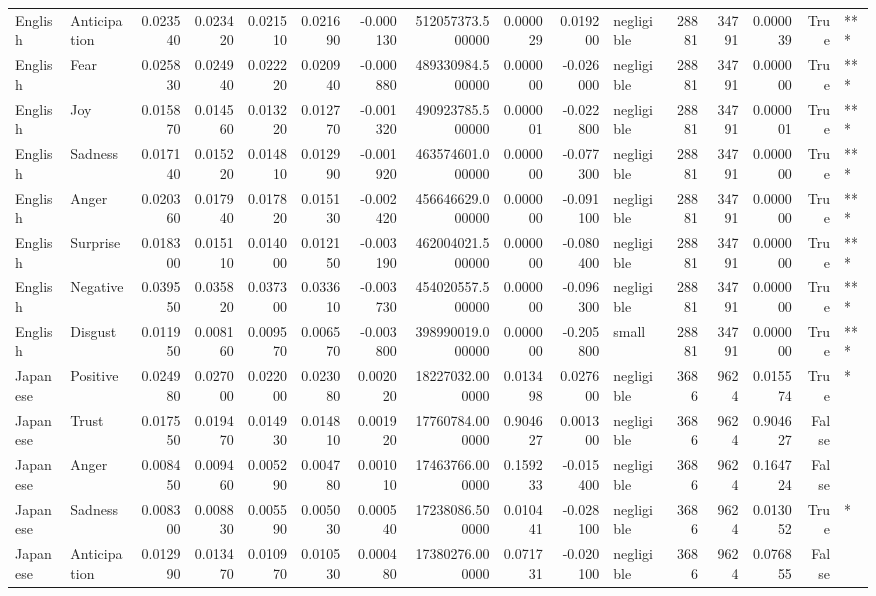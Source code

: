 \begin{tabular}{llrrrrrrrrlrrrrl}
English & Anticipation & 0.023540 & 0.023420 & 0.021510 & 0.021690 & -0.000130 & 512057373.500000 & 0.000029 & 0.019200 & negligible & 28881 & 34791 & 0.000039 & True & *** \\
English & Fear & 0.025830 & 0.024940 & 0.022220 & 0.020940 & -0.000880 & 489330984.500000 & 0.000000 & -0.026000 & negligible & 28881 & 34791 & 0.000000 & True & *** \\
English & Joy & 0.015870 & 0.014560 & 0.013220 & 0.012770 & -0.001320 & 490923785.500000 & 0.000001 & -0.022800 & negligible & 28881 & 34791 & 0.000001 & True & *** \\
English & Sadness & 0.017140 & 0.015220 & 0.014810 & 0.012990 & -0.001920 & 463574601.000000 & 0.000000 & -0.077300 & negligible & 28881 & 34791 & 0.000000 & True & *** \\
English & Anger & 0.020360 & 0.017940 & 0.017820 & 0.015130 & -0.002420 & 456646629.000000 & 0.000000 & -0.091100 & negligible & 28881 & 34791 & 0.000000 & True & *** \\
English & Surprise & 0.018300 & 0.015110 & 0.014000 & 0.012150 & -0.003190 & 462004021.500000 & 0.000000 & -0.080400 & negligible & 28881 & 34791 & 0.000000 & True & *** \\
English & Negative & 0.039550 & 0.035820 & 0.037300 & 0.033610 & -0.003730 & 454020557.500000 & 0.000000 & -0.096300 & negligible & 28881 & 34791 & 0.000000 & True & *** \\
English & Disgust & 0.011950 & 0.008160 & 0.009570 & 0.006570 & -0.003800 & 398990019.000000 & 0.000000 & -0.205800 & small & 28881 & 34791 & 0.000000 & True & *** \\
Japanese & Positive & 0.024980 & 0.027000 & 0.022000 & 0.023080 & 0.002020 & 18227032.000000 & 0.013498 & 0.027600 & negligible & 3686 & 9624 & 0.015574 & True & * \\
Japanese & Trust & 0.017550 & 0.019470 & 0.014930 & 0.014810 & 0.001920 & 17760784.000000 & 0.904627 & 0.001300 & negligible & 3686 & 9624 & 0.904627 & False &  \\
Japanese & Anger & 0.008450 & 0.009460 & 0.005290 & 0.004780 & 0.001010 & 17463766.000000 & 0.159233 & -0.015400 & negligible & 3686 & 9624 & 0.164724 & False &  \\
Japanese & Sadness & 0.008300 & 0.008830 & 0.005590 & 0.005030 & 0.000540 & 17238086.500000 & 0.010441 & -0.028100 & negligible & 3686 & 9624 & 0.013052 & True & * \\
Japanese & Anticipation & 0.012990 & 0.013470 & 0.010970 & 0.010530 & 0.000480 & 17380276.000000 & 0.071731 & -0.020100 & negligible & 3686 & 9624 & 0.076855 & False &  \\

\end{tabular}
